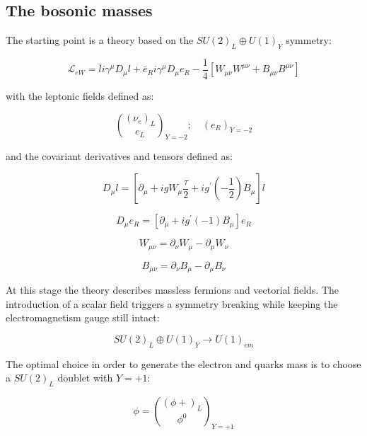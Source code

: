 \subsection{The bosonic masses}

The starting point is a theory based on the $SU(2)_{L} \oplus U(1)_{Y}$ symmetry:

\begin{equation}
\mathcal{L}_{eW} = \bar{l}i\gamma^{\mu} D_{\mu}l + \bar{e}_{R}i\gamma^{\mu}D_{\mu}e_{R} − \dfrac{1}{4}[W_{\mu\nu}W^{\mu\nu} +B_{\mu\nu}B^{\mu\nu}]
\label{eq::lagrangian_ew}
\end{equation}

with the leptonic fields defined as:

\begin{equation}
\binom{(\nu_{e})_{L}}{e_{L}}_{Y=−2} ; \quad (e_{R})_{Y=−2}
\label{eq::fields_scheme}
\end{equation}

and the covariant derivatives and tensors defined as:

\begin{equation}
D_{\mu}l = [\partial_{\mu} + igW_{\mu} \dfrac{\tau}{2}  + ig^{\prime}(-\dfrac{1}{2})B_{\mu}]l 
\end{equation}

\begin{equation}
D_{\mu}e_{R} = [\partial_{\mu} + ig^{\prime}(-1)B_{\mu}]e_{R}
\end{equation}

\begin{equation}
W_{\mu\nu} =\partial_{\nu}W_{\mu} - \partial_{\mu}W_{\nu} 
\end{equation}

\begin{equation}
B_{\mu\nu} =\partial_{\nu}B_{\mu} - \partial_{\mu}B_{\nu} 
\end{equation}

At this stage the theory describes massless fermions and vectorial fields. The introduction of a scalar field triggers a symmetry breaking while keeping the electromagnetism gauge still intact:

\begin{equation}
SU(2)_{L} \oplus U(1)_{Y} \rightarrow U(1)_{em}
\end{equation}

The optimal choice in order to generate the electron and quarks mass is to choose a $SU(2)_{L}$ doublet with $Y = +1$: 

\begin{equation}
\phi = \binom{(\phi{+})_{L}}{\phi^{0}}_{Y=+1}
\label{eq::su2_doublet}
\end{equation}

